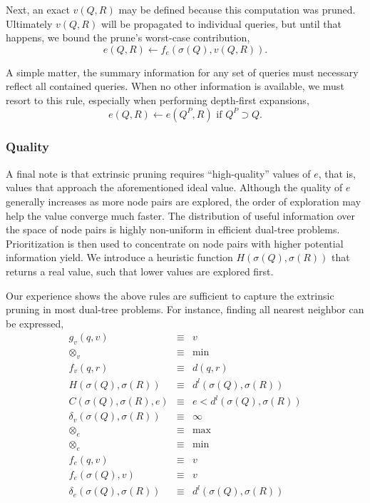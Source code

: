 \documentclass[twoside,leqno,twocolumn]{article}
\newcommand{\summary}{\delta}
\newcommand{\mysubsub}[1]{\subsubsection{#1} }
\newcommand{\kdparent}[1]{#1^{\!P}}
\newcommand{\lo}[1]{#1^{l}}
\newcommand{\distlo}{\lo{d}}
\newcommand{\dist}[2]{d(#1,#2)}
\newcommand{\nameop}[2]{#1_{\!#2}}
\newcommand{\myop}[1]{\nameop{\otimes}{#1}}
\newcommand{\letterqr}{v}
\newcommand{\inqr}{v}
\newcommand{\opqr}{\myop{\letterqr}}
\newcommand{\fqr}{f_{\letterqr}}
\newcommand{\gqr}{g_{\letterqr}}
\newcommand{\letterqrv}{v}
\newcommand{\inqrv}{v}
\newcommand{\deltaqrv}{\summary_{\letterqrv}}
\newcommand{\lettermu}{e}
\newcommand{\inmu}{e}
\newcommand{\outopmu}{\myop{\lettermu}}
\newcommand{\opmu}{\myop{\lettermu}}
\newcommand{\fmu}{f_{\lettermu}}
\newcommand{\fmuv}{f_{\lettermu}}
\newcommand{\deltamu}{\summary_{\lettermu}}
\newcommand{\canprunemu}{C}
\newcommand{\heurqr}{H}
\newcommand{\outstat}{\sigma}
\begin{document}
Next, an exact $\inqrv(Q, R)$ may be defined because this computation was pruned.
Ultimately $\inqrv(Q, R)$ will be propagated to individual queries, but until that happens, we bound the prune's worst-case contribution,
\begin{equation}
\inmu(Q, R) \gets \fmuv(\outstat(Q), \inqrv(Q, R)).
\label{eqn:muprune}
\end{equation}

\noindent
A simple matter, the summary information for any set of queries must necessary reflect all contained queries.
When no other information is available, we must resort to this rule, especially when performing depth-first expansions,
\begin{equation}
\inmu(Q, R) \gets \inmu(\kdparent{Q}, R) \text{ if } \kdparent{Q} \supset Q.
\label{eqn:muparent}
\end{equation}

\mysubsub{Quality}
A final note is that extrinsic pruning requires ``high-quality'' values of $\inmu$, that is, values that approach the aforementioned ideal value.
Although the quality of $\lettermu$ generally increases as more node pairs are explored, the order of exploration may help the value converge much faster.
The distribution of useful information over the space of node pairs is highly non-uniform in efficient dual-tree problems.
Prioritization is then used to concentrate on node pairs with higher potential information yield.
We introduce a heuristic function $\heurqr(\outstat(Q),\outstat(R))$ that returns a real value, such that lower values are explored first.

Our experience shows the above rules are sufficient to capture the extrinsic pruning in most dual-tree problems.
For instance, finding all nearest neighbor can be expressed,
\begin{eqnarray*}
\gqr(q, \inqr) &\equiv& \inqr
\\
\opqr &\equiv& \min
\\
\fqr(q,r) &\equiv& \dist{q}{r}
\\
\heurqr(\outstat(Q),\outstat(R)) &\equiv& \distlo(\outstat(Q), \outstat(R))
\\
\canprunemu(\outstat(Q), \outstat(R), \lettermu)
 &\equiv& \lettermu < \distlo(\outstat(Q), \outstat(R))
\\
\deltaqrv(\outstat(Q),\outstat(R)) &\equiv& \infty
\\
\outopmu &\equiv& \max
\\
\opmu &\equiv& \min
\\
\fmu(q, \letterqr) &\equiv& \letterqr
\\
\fmuv(\outstat(Q), \letterqrv) &\equiv& \letterqrv
\\
\deltamu(\outstat(Q),\outstat(R)) &\equiv& \distlo(\outstat(Q),\outstat(R))
\end{eqnarray*}
\end{document}
